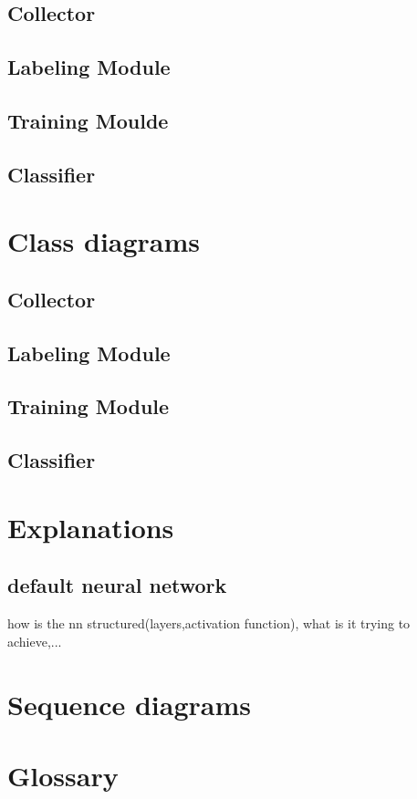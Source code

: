 \documentclass[parskip=full]{scrartcl}
\begin{document}
\subsection{Collector}
\subsection{Labeling Module}
\subsection{Training Moulde}

\subsection{Classifier}


\section{Class diagrams}

\subsection{Collector}
\subsection{Labeling Module}
\subsection{Training Module}
\subsection{Classifier}


\section{Explanations}
\subsection{default neural network}
how is the nn structured(layers,activation function), what is it trying to achieve,...


\section{Sequence diagrams}

\section{Glossary}

%
\printnoidxglossaries
\end{document}
